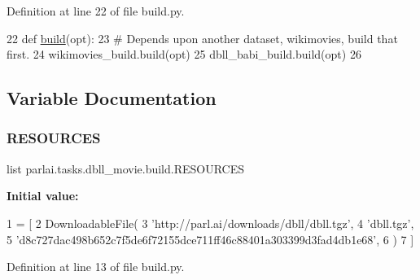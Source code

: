 Definition at line 22 of file build.\+py.


\begin{DoxyCode}
22 \textcolor{keyword}{def }\hyperlink{namespacedialog__babi__feedback_1_1build_a7a9d289f7493a5ded13c4b7f071b6184}{build}(opt):
23     \textcolor{comment}{# Depends upon another dataset, wikimovies, build that first.}
24     wikimovies\_build.build(opt)
25     dbll\_babi\_build.build(opt)
26 \end{DoxyCode}


\subsection{Variable Documentation}
\mbox{\label{namespaceparlai_1_1tasks_1_1dbll__movie_1_1build_acd0aebde6c9b95583970843821abb78e}} 
\subsubsection{\texorpdfstring{R\+E\+S\+O\+U\+R\+C\+ES}{RESOURCES}}
{\footnotesize\ttfamily list parlai.\+tasks.\+dbll\+\_\+movie.\+build.\+R\+E\+S\+O\+U\+R\+C\+ES}

{\bfseries Initial value\+:}
\begin{DoxyCode}
1 =  [
2     DownloadableFile(
3         \textcolor{stringliteral}{'http://parl.ai/downloads/dbll/dbll.tgz'},
4         \textcolor{stringliteral}{'dbll.tgz'},
5         \textcolor{stringliteral}{'d8c727dac498b652c7f5de6f72155dce711ff46c88401a303399d3fad4db1e68'},
6     )
7 ]
\end{DoxyCode}


Definition at line 13 of file build.\+py.


